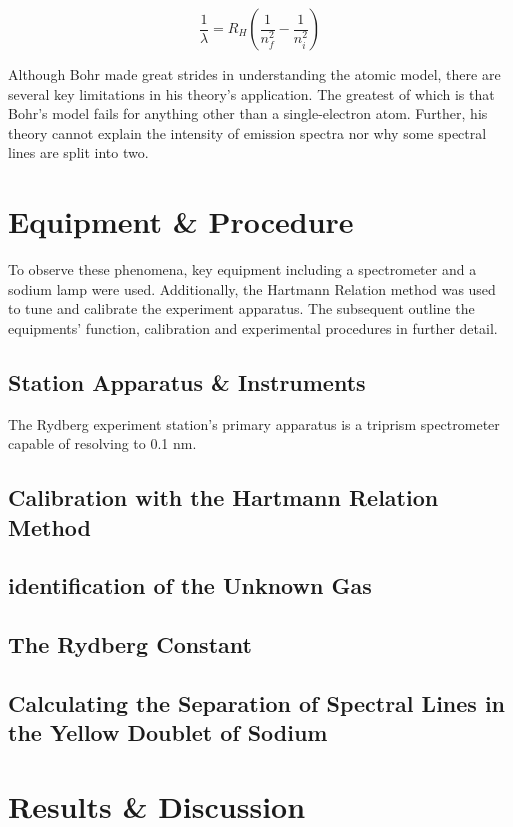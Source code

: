 \documentclass{article} %
\begin{document}
\begin{multicols}{2}
\[
\frac{1}{\lambda} = R_H \left( \frac{1}{n_f^2} - \frac{1}{n_i^2} \right)
\]

Although Bohr made great strides in understanding the atomic model, there are several key limitations in his theory's application.
The greatest of which is that Bohr's model fails for anything other than a single-electron atom.
Further, his theory cannot explain the intensity of emission spectra nor why some spectral lines are split into two.

\section{Equipment \& Procedure}

To observe these phenomena, key equipment including a spectrometer and a sodium lamp were used.
Additionally, the Hartmann Relation method was used to tune and calibrate the experiment apparatus.
The subsequent outline the equipments' function, calibration and experimental procedures in further detail.

\subsection{Station Apparatus \& Instruments}

The Rydberg experiment station's primary apparatus is a triprism spectrometer capable of resolving to 0.1 nm.


\subsection{Calibration with the Hartmann Relation Method}

\subsection{identification of the Unknown Gas}

\subsection{The Rydberg Constant}

\subsection{Calculating the Separation of Spectral Lines in the Yellow Doublet of Sodium}

\section{Results \& Discussion}


\end{multicols}
\end{document}
